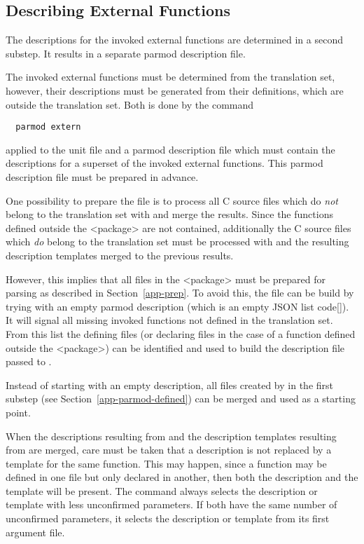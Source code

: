 \subsection{Describing External Functions}
\label{app-parmod-extern}

The descriptions for the invoked external functions are determined in a second substep. It results in 
a separate parmod description file. 

The invoked external functions must be determined from the translation set, however, their descriptions must
be generated from their definitions, which are outside the translation set. Both is done by the command
\begin{verbatim}
  parmod extern
\end{verbatim}
applied to the unit file and a parmod description file which must contain the descriptions for a superset
of the invoked external functions. This parmod description file must be prepared in advance.

One possibility to prepare the file is to process all C source files which do \textit{not} belong to the 
translation set with  and merge the results. Since the functions defined outside the <package>
are not contained, additionally the C source files which \textit{do} belong to the translation set must be
processed with  and the resulting description templates merged to the previous results. 

However, this implies that all files in the
<package> must be prepared for parsing as described in Section~\ref{app-prep}. To avoid this, the file can
be build by trying  with an empty parmod description (which is an empty JSON list code{[]}).
It will signal all missing invoked functions not defined in the translation set. From this list the defining 
files (or declaring files in the case of a function defined outside the <package>) can be identified and used 
to build the description file passed to .

Instead of starting with an empty description, all files created by  in the first substep 
(see Section~\ref{app-parmod-defined}) can be merged and used as a starting point.  

When the descriptions resulting from  and the description templates resulting from 
are merged, care must be taken that a description is not replaced by a template for the same function. This may 
happen, since a function may be defined in one  file but only declared in another, then both the description
and the template will be present. The command  always selects the description or template with less 
unconfirmed parameters. If both have the same number of unconfirmed parameters, it selects the description or template from
its first argument file. 


